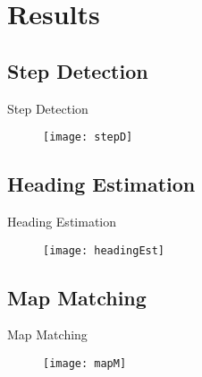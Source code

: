 \section{Results} \label{sec:results}%

\subsection{Step Detection} \label{ssec:results_stepD}
\begin{frame}{Step Detection}
	
	\begin{figure}
		\centering
		\texttt{[image: stepD]}
	\end{figure}

\end{frame}

\subsection{Heading Estimation} \label{ssec:results_headinEst}
\begin{frame}{Heading Estimation}
	
		\begin{figure}
			\centering
			\texttt{[image: headingEst]}
		\end{figure}

\end{frame}

\subsection{Map Matching} \label{ssec:results_mapM}
\begin{frame}{Map Matching}
	
	\begin{figure}
		\centering
		\texttt{[image: mapM]}
	\end{figure}
	
\end{frame}